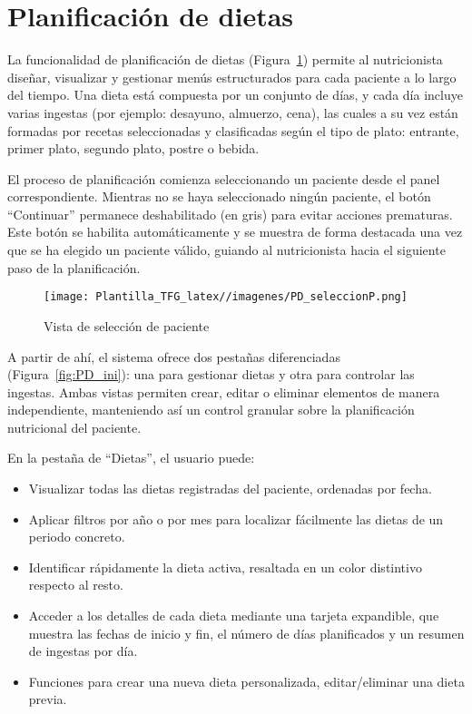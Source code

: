 \section{Planificación de dietas}
La funcionalidad de planificación de dietas (Figura~\ref{fig:PD_seleccionP}) permite al nutricionista diseñar, visualizar y gestionar menús estructurados para cada paciente a lo largo del tiempo. Una dieta está compuesta por un conjunto de días, y cada día incluye varias ingestas (por ejemplo: desayuno, almuerzo, cena), las cuales a su vez están formadas por recetas seleccionadas y clasificadas según el tipo de plato: entrante, primer plato, segundo plato, postre o bebida.

El proceso de planificación comienza seleccionando un paciente desde el panel correspondiente. Mientras no se haya seleccionado ningún paciente, el botón ``Continuar'' permanece deshabilitado (en gris) para evitar acciones prematuras. Este botón se habilita automáticamente y se muestra de forma destacada una vez que se ha elegido un paciente válido, guiando al nutricionista hacia el siguiente paso de la planificación. 

\begin{figure}[t]
    \centering
    \texttt{[image: Plantilla\_TFG\_latex//imagenes/PD\_seleccionP.png]}
    \caption{Vista de selección de paciente}
    \label{fig:PD_seleccionP}
\end{figure}

A partir de ahí, el sistema ofrece dos pestañas diferenciadas (Figura~\ref{fig:PD_ini}): una para gestionar dietas y otra para controlar las ingestas. Ambas vistas permiten crear, editar o eliminar elementos de manera independiente, manteniendo así un control granular sobre la planificación nutricional del paciente.

En la pestaña de ``Dietas'', el usuario puede:
\begin{itemize}
    \item Visualizar todas las dietas registradas del paciente, ordenadas por fecha.
    \item Aplicar filtros por año o por mes para localizar fácilmente las dietas de un periodo concreto.
    \item Identificar rápidamente la dieta activa, resaltada en un color distintivo respecto al resto.
    \item Acceder a los detalles de cada dieta mediante una tarjeta expandible, que muestra las fechas de inicio y fin, el número de días planificados y un resumen de ingestas por día.
    \item Funciones para crear una nueva dieta personalizada, editar/eliminar una dieta previa.
\end{itemize}

